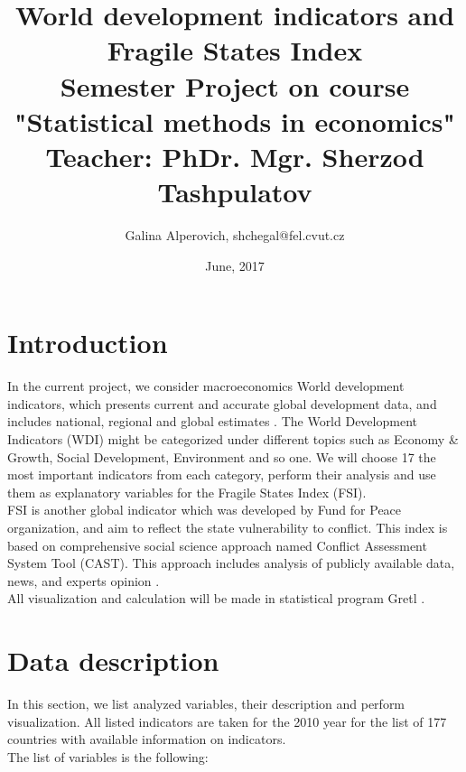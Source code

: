 \documentclass{article}
\title{
World development indicators and Fragile States Index\\
\large Semester Project on course "Statistical methods in economics"\\
Teacher: PhDr. Mgr. Sherzod Tashpulatov}
\author{Galina Alperovich, shchegal@fel.cvut.cz}
\date{June, 2017}
\begin{document}
\maketitle
\tableofcontents


\newpage
\section{Introduction}
In the current project, we consider macroeconomics World development indicators, which presents current and accurate global development data, and includes national, regional and global estimates \cite{WDI_site}. The World Development Indicators (WDI) might be categorized under different topics such as Economy & Growth, Social Development, Environment and so one.  We will choose 17 the most important indicators from each category, perform their analysis and use them as explanatory variables for the Fragile States Index (FSI). \\

FSI is another global indicator which was developed by Fund for Peace organization, and aim to reflect the state vulnerability to conflict. This index is based on comprehensive social science approach named Conflict Assessment System Tool (CAST). This approach includes analysis of publicly available data, news, and experts opinion \cite{FSI}.\\

All visualization and calculation will be made in statistical program Gretl \cite{Gretl}.


\section{Data description}
In this section, we list analyzed variables, their description and perform visualization. All listed indicators are taken for the 2010 year for the list of 177 countries with available information on indicators.\\

The list of variables is the following:
\end{document}

